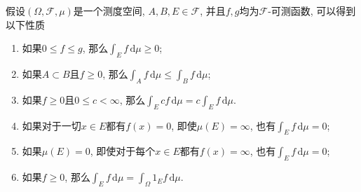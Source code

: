 \documentclass[cn, 12pt, math=mtpro2, bibstyle=apa, blue, twocol]{elegantbook}
\newcommand{\F}{\mathcal{F}}
\newcommand{\du}{\,\text{d}\mu}
\begin{document}
假设$(\Omega,\F,\mu)$是一个测度空间, $A,B,E\in\F$, 并且$f,g$均为$\F$-可测函数, 可以得到以下性质
\begin{enumerate}[label=(\arabic*)]
  \item 如果$0\leq f\leq g$, 那么$\int_Ef\du\geq 0$;
  \item 如果$A\subset B$且$f\geq 0$, 那么$\int_Af\du\leq\int_Bf\du$;
  \item 如果$f\geq0$且$0\leq c<\infty$, 那么$\int_Ecf\du=c\int_Ef\du$.
  \item 如果对于一切$x\in E$都有$f(x)=0$, 即使$\mu(E)=\infty$, 也有$\int_Ef\du=0$;
  \item 如果$\mu(E)=0$, 即使对于每个$x\in E$都有$f(x)=\infty$, 也有$\int_Ef\du=0$;
  \item 如果$f\geq0$, 那么$\int_Ef\du=\int_\Omega 1_Ef\du$.
\end{enumerate}
\end{document}
